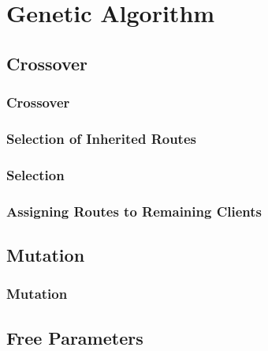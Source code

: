 \documentclass{beamer}
\begin{document}
\section{Genetic Algorithm}

\subsection{Crossover}
\begin{frame}
\frametitle{Crossover}
\begin{center}
\end{center}
\end{frame}

\subsubsection{Selection of Inherited Routes}
\begin{frame}
\frametitle{Selection}
\begin{center}
\end{center}
\end{frame}

\subsubsection{Assigning Routes to Remaining Clients}
\begin{frame}
\frametitle{}
\begin{center}
\end{center}
\end{frame}

\subsection{Mutation}
\begin{frame}
\frametitle{Mutation}
\begin{center}
\end{center}
\end{frame}

\subsection{Free Parameters}
\begin{frame}
\frametitle{}
\begin{center}
\end{center}
\end{frame}
\end{document}
